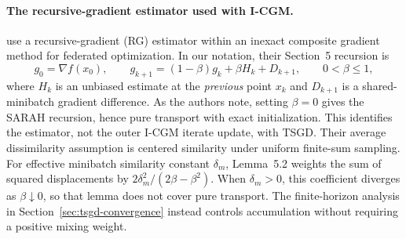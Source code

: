\paragraph{The recursive-gradient estimator used with I-CGM.}
\citet{jiang2026nonconvex} use a recursive-gradient (RG) estimator
within an inexact composite gradient method for federated optimization.
In our notation, their Section~5 recursion is
\[
g_0=\nabla f(x_0),\qquad
g_{k+1}=(1-\beta)g_k+\beta H_k+D_{k+1},
\qquad 0<\beta\leq1,
\]
where $H_k$ is an unbiased estimate at the \emph{previous} point $x_k$
and $D_{k+1}$ is a shared-minibatch gradient difference. As the authors
note, setting $\beta=0$ gives the SARAH recursion, hence pure transport
with exact initialization. This identifies the estimator, not the outer
I-CGM iterate update, with TSGD. Their average dissimilarity assumption
is centered similarity under uniform finite-sum sampling.
For effective minibatch similarity constant $\delta_m$, Lemma~5.2
weights the sum of squared displacements by
$2\delta_m^2/(2\beta-\beta^2)$. When $\delta_m>0$, this coefficient
diverges as $\beta\downarrow0$, so that lemma does not cover pure
transport. The finite-horizon analysis in Section~\ref{sec:tsgd-convergence}
instead controls accumulation without requiring a positive mixing weight.
